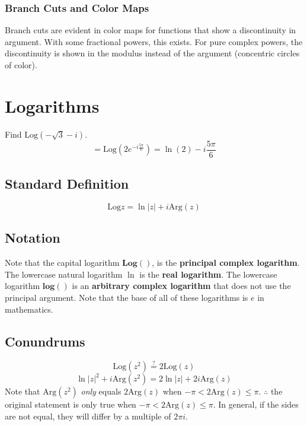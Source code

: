 \documentclass[../main.tex]{subfiles}
\begin{document}
    \subsubsection{Branch Cuts and Color Maps}
        Branch cuts are evident in color maps for functions that show a discontinuity in argument. With some fractional powers,
        this exists. For pure complex powers, the discontinuity is shown in the modulus instead of the argument (concentric circles of color).

\section{Logarithms}
    Find $\text{Log}(-\sqrt{3}-i)$. 
    $$=\text{Log}(2e^{-i\frac{5\pi}{6}})=\ln(2)-i\frac{5\pi}{6}$$

    \subsection{Standard Definition}
        $$\text{Log}z=\ln|z|+i\text{Arg}(z)$$

    \subsection{Notation}
        Note that the capital logarithm $\textbf{Log}()$, is the \textbf{principal complex logarithm}.
        The lowercase natural logarithm $\ln$ is the \textbf{real logarithm}. The lowercase logarithm $\textbf{log}()$ is 
        an \textbf{arbitrary complex logarithm} that does not use the principal argument. Note that the base
        of all of these logarithms is $e$ in mathematics.

    \subsection{Conundrums}
        $$\text{Log}(z^{2})\stackrel{?}{=}2\text{Log}(z)$$
        $$\ln|z|^{2}+i\text{Arg}(z^{2})=2\ln|z|+2i\text{Arg}(z)$$
        Note that $\text{Arg}(z^{2})$ {\it only} equals $2\text{Arg}(z)$ when $-\pi< 2\text{Arg}(z)\leq \pi$.
        $\therefore$ the original statement is only true when $-\pi<2\text{Arg}(z)\leq \pi$. In general, if the sides are not equal, they will differ
        by a multiple of $2\pi i$.
\end{document}
